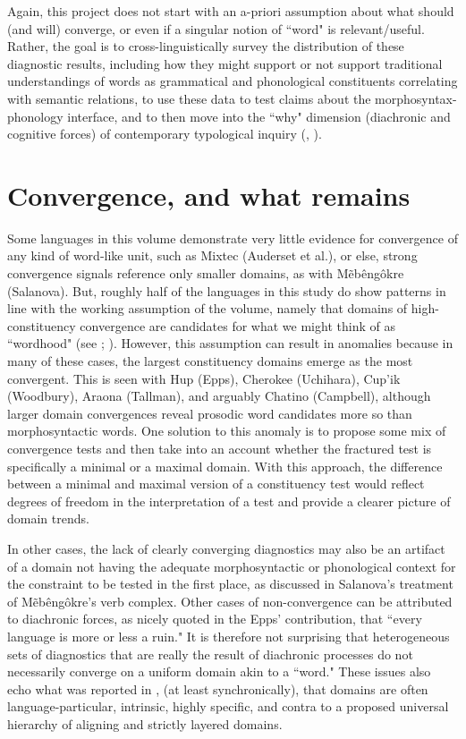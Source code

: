 \documentclass[output=paper]{langscibook}
\begin{document}
Again, this project does not start with an a-priori assumption about what should (and will) converge, or even if a singular notion of ``word" is relevant{\slash}useful. Rather, the goal is to cross-linguistically survey the distribution of these diagnostic results, including how they might support or not support traditional understandings of words as grammatical and phonological constituents correlating with semantic relations, to use these data to test claims about the morphosyn\-tax-phonology interface, and to then move into the ``why" dimension (diachronic and cognitive forces) of contemporary typological inquiry (\citealt{bickel_typology_2007}, \citealt{levinson_original_2012}).

\section{Convergence, and what remains}

Some languages in this volume demonstrate very little evidence for convergence of any kind of word-like unit, such as Mixtec (Auderset et al.), or else, strong convergence signals reference only smaller domains, as with Mẽbêngôkre (Salanova). But, roughly half of the languages in this study do show patterns in line with the working assumption of the volume, namely that domains of high-constituency convergence are candidates for what we might think of as ``wordhood" (see \citealt{Matthews2002}; \citealt{Tallman2021}). However, this assumption can result in anomalies because in many of these cases, the largest constituency domains emerge as the most convergent. This is seen with Hup (Epps), Cherokee (Uchihara), Cup’ik (Woodbury), Araona (Tallman), and arguably Chatino (Campbell), although lar\-ger domain convergences reveal prosodic word candidates more so than morphosyntactic words. One solution to this anomaly is to propose some mix of convergence tests and then take into an account whether the fractured test is specifically a minimal or a maximal domain. With this approach, the difference between a minimal and maximal version of a constituency test would reflect degrees of freedom in the interpretation of a test and provide a clearer picture of domain trends.

In other cases, the lack of clearly converging diagnostics may also be an artifact of a domain not having the adequate morphosyntactic or phonological context for the constraint to be tested in the first place, as discussed in Salanova's treatment of Mẽbêngôkre's verb complex. Other cases of non-convergence can be attributed to diachronic forces, as nicely quoted in the Epps’ contribution, that ``every language is more or less a ruin." It is therefore not surprising that heterogeneous sets of diagnostics that are really the result of diachronic processes do not necessarily converge on a uniform domain akin to a ``word." These issues also echo what was reported in \citealt{schieringetal:2010}, (at least synchronically), that domains are often language-particular, intrinsic, highly specific, and contra to a proposed universal hierarchy of aligning and strictly layered domains.
\end{document}
